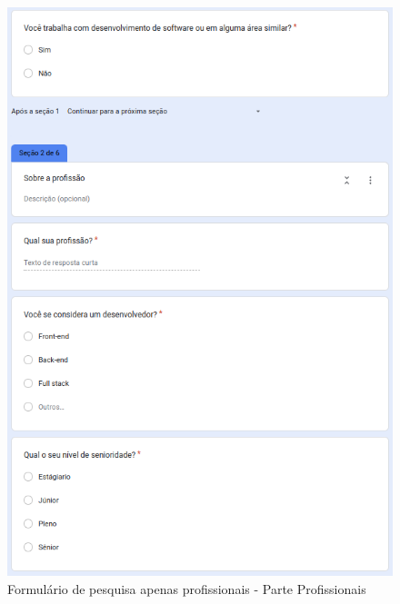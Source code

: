 \begin{figure}[!h]
	\begin{center}
	    \includegraphics[scale=0.6]{figs/Form/02.png}
	\end{center}
	\caption{\label{AP_PPr}Formulário de pesquisa apenas profissionais - Parte Profissionais}
\end{figure}

\newpage

